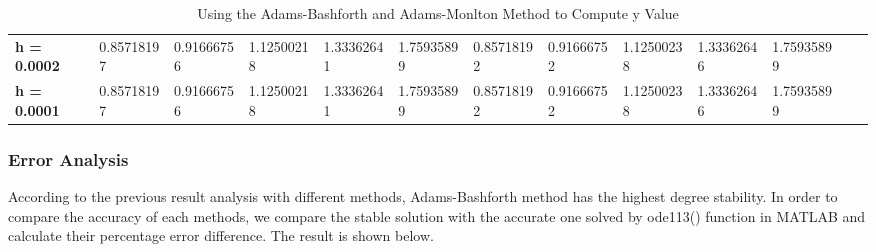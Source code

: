 \documentclass[a4paper]{article}
\begin{document}
\begin{table}[H]
{\begin{tabular}{@{}lllllllllllll@{}}
				\textbf{h = 0.0002}             & 0.85718197                             & 0.91666756                             & 1.12500218                            & 1.33362641                            & 1.75935899                                                            & 0.85718192                             & 0.91666752                             & 1.12500238                            & 1.33362646       & 1.75935899                  \\
				\textbf{h = 0.0001}             & 0.85718197                             & 0.91666756                             & 1.12500218                            & 1.33362641                            & 1.75935899                                                            & 0.85718192                             & 0.91666752                             & 1.12500238                            & 1.33362646       & 1.75935899         \\
				\bottomrule
			\end{tabular}%
		}
		\caption{Using the Adams-Bashforth and Adams-Monlton Method to Compute y Value }
		\label{tab:IVP2_AD}
	\end{table}
	
	\subsubsection{Error Analysis}
	
	According to the previous result analysis with different methods, Adams-Bashforth method has the highest degree stability. In order to compare the accuracy of each methods, we compare the stable solution with the accurate one solved by ode113() function in MATLAB and calculate their percentage error difference. The result is shown below.
	
\end{document}
